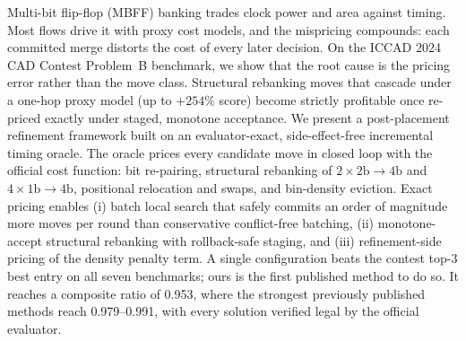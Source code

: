 Multi-bit flip-flop (MBFF) banking trades clock power and area against timing. Most flows drive it with proxy cost models, and the mispricing compounds: each committed merge distorts the cost of every later decision. On the ICCAD 2024 CAD Contest Problem~B benchmark, we show that the root cause is the pricing error rather than the move class. Structural rebanking moves that cascade under a one-hop proxy model (up to $+254\%$ score) become strictly profitable once re-priced exactly under staged, monotone acceptance. We present a post-placement refinement framework built on an evaluator-exact, side-effect-free incremental timing oracle. The oracle prices every candidate move in closed loop with the official cost function: bit re-pairing, structural rebanking of $2{\times}2\mathrm{b}{\to}4\mathrm{b}$ and $4{\times}1\mathrm{b}{\to}4\mathrm{b}$, positional relocation and swaps, and bin-density eviction. Exact pricing enables (i) batch local search that safely commits an order of magnitude more moves per round than conservative conflict-free batching, (ii) monotone-accept structural rebanking with rollback-safe staging, and (iii) refinement-side pricing of the density penalty term. A single configuration beats the contest top-3 best entry on all seven benchmarks; ours is the first published method to do so. It reaches a composite ratio of 0.953, where the strongest previously published methods reach 0.979--0.991, with every solution verified legal by the official evaluator.

